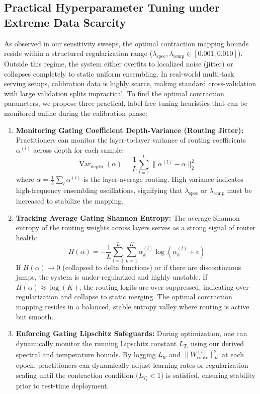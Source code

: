 \documentclass{article}
\theoremstyle{plain}
\theoremstyle{definition}
\theoremstyle{remark}
\begin{document}
\subsection{Practical Hyperparameter Tuning under Extreme Data Scarcity}
As observed in our sensitivity sweeps, the optimal contraction mapping bounds reside within a structured regularization range ($\lambda_{\text{spec}}, \lambda_{\text{temp}} \in [0.001, 0.010]$). Outside this regime, the system either overfits to localized noise (jitter) or collapses completely to static uniform ensembling. In real-world multi-task serving setups, calibration data is highly scarce, making standard cross-validation with large validation splits impractical. To find the optimal contraction parameters, we propose three practical, label-free tuning heuristics that can be monitored online during the calibration phase:
\begin{enumerate}
  \item \textbf{Monitoring Gating Coefficient Depth-Variance (Routing Jitter):} Practitioners can monitor the layer-to-layer variance of routing coefficients $\alpha^{(l)}$ across depth for each sample:
  \begin{equation}
  \operatorname{Var}_{\text{depth}}(\alpha) = \frac{1}{L} \sum_{l=1}^L \| \alpha^{(l)} - \bar{\alpha} \|_2^2
  \end{equation}
  where $\bar{\alpha} = \frac{1}{L} \sum_l \alpha^{(l)}$ is the layer-average routing. High variance indicates high-frequency ensembling oscillations, signifying that $\lambda_{\text{spec}}$ or $\lambda_{\text{temp}}$ must be increased to stabilize the mapping.
  \item \textbf{Tracking Average Gating Shannon Entropy:} The average Shannon entropy of the routing weights across layers serves as a strong signal of router health:
  \begin{equation}
  H(\alpha) = -\frac{1}{L} \sum_{l=1}^L \sum_{k=1}^K \alpha_k^{(l)} \log\left(\alpha_k^{(l)} + \epsilon \right)
  \end{equation}
  If $H(\alpha) \to 0$ (collapsed to delta functions) or if there are discontinuous jumps, the system is under-regularized and highly unstable. If $H(\alpha) \approx \log(K)$, the routing logits are over-suppressed, indicating over-regularization and collapse to static merging. The optimal contraction mapping resides in a balanced, stable entropy valley where routing is active but smooth.
  \item \textbf{Enforcing Gating Lipschitz Safeguards:} During optimization, one can dynamically monitor the running Lipschitz constant $L_{T_l}$ using our derived spectral and temperature bounds. By logging $L_w$ and $\|W_{\text{route}}^{(l)}\|_F^2$ at each epoch, practitioners can dynamically adjust learning rates or regularization scaling until the contraction condition ($L_{T_l} < 1$) is satisfied, ensuring stability prior to test-time deployment.
\end{enumerate}
\end{document}
